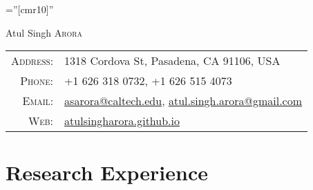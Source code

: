 \documentclass[a4paper,10pt]{article}
\begin{document}

\pagestyle{empty} %

\font\fb=''[cmr10]'' %

		{\Huge Atul Singh \textsc{Arora}}    


\begin{tabular}{rl}
    \textsc{\color{gray} Address:}   & 1318 Cordova St, Pasadena, CA 91106, USA \\
    \textsc{\color{gray} Phone:}     & +1 626 318 0732,
                        +1 626 515 4073\\
    \textsc{\color{gray} Email:}     & \href{mailto:asarora@caltech.edu}{asarora@caltech.edu}, \href{mailto:atul.singh.arora@gmail.com}{atul.singh.arora@gmail.com} \\
    \textsc{\color{gray} Web:} &\href{https://atulsingharora.github.io}{atulsingharora.github.io}
\end{tabular}


\section{Research Experience}
\end{document}
